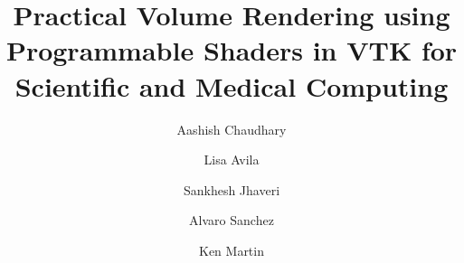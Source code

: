 \title{Practical Volume Rendering using Programmable Shaders in VTK for Scientific and Medical Computing}

\author{Aashish Chaudhary}

\author{Lisa Avila}

\author{Sankhesh Jhaveri}

\author{Alvaro Sanchez\corref{}}

\author{Ken Martin}

\address{Kitware, Inc., 28 Corporate Drive, Clifton Park, NY 12065, USA}
